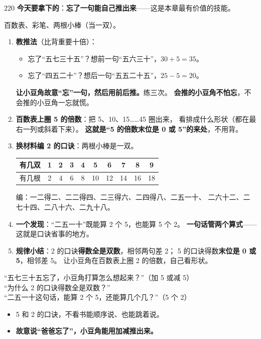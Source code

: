 \begin{lesson}{2}{20}
\textbf{今天要拿下的}：\textbf{忘了一句能自己推出来}——这是本章最有价值的技能。

\begin{materials}
百数表、彩笔、两根小棒（当一双）。
\end{materials}

\begin{enumerate}
  \item \textbf{教推法}（比背重要十倍）：
        \begin{itemize}
          \item 忘了“五七三十五”？想前一句“五六三十”，$30+5=35$。
          \item 忘了“四五二十”？想后一句“五五二十五”，$25-5=20$。
        \end{itemize}
        \textbf{让小豆角故意“忘”一句，然后用前后推。}练三次。
        \textbf{会推的小豆角不怕忘}，不会推的小豆角一忘就慌。
  \item \textbf{百数表上圈 5 的倍数}：把 5、10、15……45 圈出来，
        看排成什么形状（都在最右一列或斜着下来）。
        \textbf{这就是“5 的倍数末位是 0 或 5”的来处}，不用背。
  \item \textbf{换材料编 2 的口诀}：两根小棒是一双。
        \begin{center}
        \small
        \begin{tabular}{@{}l*{9}{c}@{}}
        \toprule
        有几双 & 1 & 2 & 3 & 4 & 5 & 6 & 7 & 8 & 9 \\
        \midrule
        有几根 & 2 & 4 & 6 & 8 & 10 & 12 & 14 & 16 & 18 \\
        \bottomrule
        \end{tabular}
        \end{center}
        编：一二得二、二二得四、二三得六、二四得八、二五一十、
        二六十二、二七十四、二八十六、二九十八。
  \item \textbf{一个发现}：“二五一十”既能算 2 个 5，也能算 5 个 2。
        \textbf{一句话管两个算式}——这就是口诀省事的地方。
  \item \textbf{规律小结}：2 的口诀\textbf{得数全是双数}，相邻两句差 2；
        5 的口诀得数\textbf{末位是 0 或 5}，相邻差 5。
        让小豆角在百数表上圈 2 的倍数，自己看形状。
\end{enumerate}

\begin{saybox}
“五七三十五忘了，小豆角打算怎么想起来？”（加 5 或减 5）\\
“为什么 2 的口诀得数全是双数？”\\
“二五一十这句话，能算 2 个 5，还能算几个几？”（5 个 2）
\end{saybox}

\begin{passbox}
\begin{itemize}
  \item 5 和 2 的口诀，不看书能顺序说、也能跳着说。
  \item \textbf{故意说“爸爸忘了”，小豆角能用加减推出来。}
\end{itemize}
\end{passbox}
\end{lesson}

